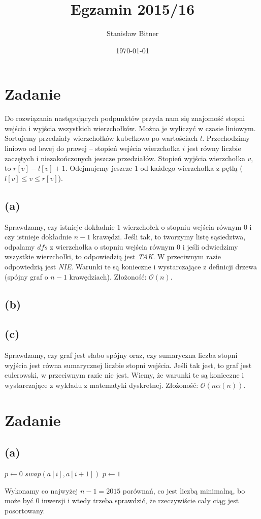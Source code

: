 \documentclass[12pt, a4paper]{article}
\title{Egzamin 2015/16}
\author{Stanisław Bitner}
\date{\today}
\newcommand{\MCALO}{\mathcal{O}}
\newcounter{zadanie}
\newcommand{\zadanie}{\addtocounter{zadanie}{1}\section*{Zadanie \arabic{zadanie}}}
\begin{document}
\maketitle
\zadanie{}

Do rozwiązania następujących podpunktów przyda nam się znajomość stopni wejścia
i wyjścia wszystkich wierzchołków. Można je wyliczyć w czasie liniowym.
Sortujemy przedziały wierzchołków kubełkowo po wartościach $l$. Przechodzimy
liniowo od lewej do prawej -- stopień wejścia wierzchołka $i$ jest równy
liczbie zaczętych i niezakończonych jeszcze przedziałów. Stopień wyjścia
wierzchołka $v$, to $r[v] - l[v] + 1$. Odejmujemy jeszcze $1$ od każdego
wierzchołka z pętlą ($l[v] \le v \le r[v]$).

\subsection*{(a)}
Sprawdzamy, czy istnieje dokładnie $1$ wierzchołek o stopniu wejścia równym $0$
i czy istnieje dokładnie $n-1$ krawędzi. Jeśli tak, to tworzymy listę
sąsiedztwa, odpalamy $dfs$ z wierzchołka o stopniu wejścia równym $0$ i jeśli
odwiedzimy wszystkie wierzchołki, to odpowiedzią jest \textit{TAK}.
W przeciwnym razie odpowiedzią jest \textit{NIE}. Warunki te są konieczne
i wystarczające z definicji drzewa (spójny graf o $n-1$ krawędziach).
Złożoność: $\MCALO(n)$.

\subsection*{(b)}

\subsection*{(c)}
Sprawdzamy, czy graf jest słabo spójny oraz, czy sumaryczna liczba stopni
wyjścia jest równa sumarycznej liczbie stopni wejścia. Jeśli tak jest, to graf
jest eulerowski, w przeciwnym razie nie jest. Wiemy, że warunki te są konieczne
i wystarczające z wykładu z matematyki dyskretnej.
Złożoność: $\MCALO(n\alpha(n))$.

\zadanie{}
\subsection*{(a)}
\begin{algorithmic}
\State $p \gets 0$
    \State $swap(a[i], a[i+1])$
      \State \Return
    \EndIf
    \State $p \gets 1$
  \EndIf
\EndFor
\end{algorithmic}
Wykonamy co najwyżej $n-1 = 2015$ porównań, co jest liczbą minimalną, bo może
być $0$ inwersji i wtedy trzeba sprawdzić, że rzeczywiście cały ciąg jest
posortowany.
\end{document}
